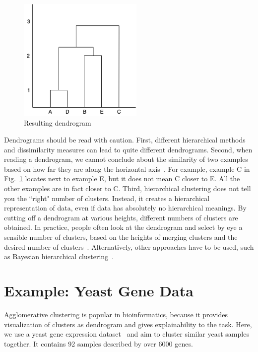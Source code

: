 \begin{figure}[htp]
\centering
\captionsetup{justification=centering}
\includegraphics[width=6cm]{"Part 3 - Learning Systems/Unsupervised Learning/Hierarchical Clustering/figures/Dendrogram.png"}
\caption{Resulting dendrogram}
\label{fig:dendro}
\end{figure}

Dendrograms should be read with caution. First, different hierarchical methods and dissimilarity measures can lead to quite different dendrograms. Second, when reading a dendrogram, we cannot conclude about the similarity of two examples based on how far they are along the horizontal axis~\cite{James2013}. For example, example C in Fig.~\ref{fig:dendro} locates next to example E, but it does not mean C closer to E. All the other examples are in fact closer to C. Third, hierarchical clustering does not tell you the ``right" number of clusters. Instead, it creates a hierarchical representation of data, even if data has absolutely no hierarchical meanings. By cutting off a dendrogram at various heights, different numbers of clusters are obtained. In practice, people often look at the dendrogram and select by eye a sensible number of clusters, based on the heights of merging clusters and the desired number of clusters~\cite{James2013}. Alternatively, other approaches have to be used, such as Bayesian hierarchical clustering~\cite{Heller2005}.

\section{Example: Yeast Gene Data}

Agglomerative clustering is popular in bioinformatics, because it provides visualization of clusters as dendrogram and gives explainability to the task. Here, we use a yeast gene expression dataset~\cite{Kaggle2016} and aim to cluster similar yeast samples together. It contains 92 samples described by over 6000 genes. 

